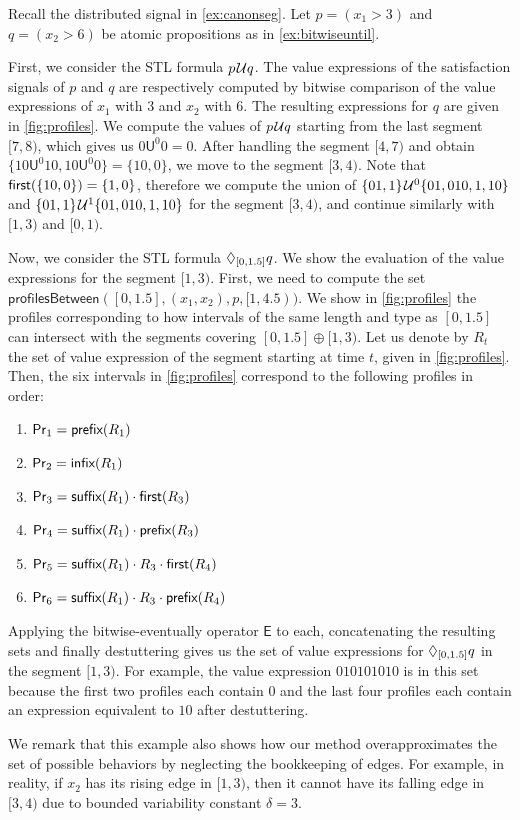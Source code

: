 \begin{example}
	Recall the distributed signal in \cref{ex:canonseg}.
	Let $p = (x_1 > 3)$ and $q = (x_2 > 6)$ be atomic propositions as in \cref{ex:bitwiseuntil}.
		
	First, we consider the STL formula $p \kern.1em\mathcal{U} q$.
	The value expressions of the satisfaction signals of $p$ and $q$ are respectively computed by bitwise comparison of the value expressions of $x_1$ with 3 and $x_2$ with 6.
	The resulting expressions for $q$ are given in \cref{fig:profiles}.
	We compute the values of $p \kern.1em\mathcal{U} q$ starting from the last segment $[7,8)$, which gives us $0 \mathsf{U}^0 0 = 0$.
	After handling the segment $[4,7)$ and obtain $\{ 10 \mathsf{U}^0 10, 10 \mathsf{U}^0 0 \} = \{10, 0\}$, we move to the segment $[3,4)$.
	Note that $\textsf{first}(\{10, 0\}) = \{1,0\}$, therefore we compute the union of $\{01, 1\} \kern.1em\mathcal{U}^0 \{01, 010, 1, 10\}$ and $\{01, 1\} \kern.1em\mathcal{U}^1 \{01, 010, 1, 10\}$ for the segment $[3,4)$, and continue similarly with $[1,3)$ and $[0,1)$.
	
	Now, we consider the STL formula $\lozenge_{[0,1.5]} q$.
	We show the evaluation of the value expressions for the segment $[1,3)$.
	First, we need to compute the set $\mathsf{profilesBetween}([0,1.5], (x_1, x_2), p, [1,4.5))$.
	We show in \cref{fig:profiles} the profiles corresponding to how intervals of the same length and type as $[0,1.5]$ can intersect with the segments covering $[0,1.5] \oplus [1,3)$.
	Let us denote by $R_t$ the set of value expression of the segment starting at time $t$, given in \cref{fig:profiles}.
	Then, the six intervals in \cref{fig:profiles} correspond to the following profiles in order:
	\begin{enumerate}
		\item $\mathsf{Pr}_1 = \textsf{prefix}(R_1)$
		\item $\mathsf{Pr}_2 = \textsf{infix}(R_1)$
		\item $\mathsf{Pr}_3 = \textsf{suffix}(R_1) \cdot \textsf{first}(R_3)$
		\item $\mathsf{Pr}_4 = \textsf{suffix}(R_1) \cdot \textsf{prefix}(R_3)$
		\item $\mathsf{Pr}_5 = \textsf{suffix}(R_1) \cdot R_3 \cdot \textsf{first}(R_4)$
		\item $\mathsf{Pr}_6 = \textsf{suffix}(R_1) \cdot R_3 \cdot \textsf{prefix}(R_4)$
	\end{enumerate}
	Applying the bitwise-eventually operator $\mathsf{E}$ to each, concatenating the resulting sets and finally destuttering gives us the set of value expressions for $\lozenge_{[0,1.5]} q$ in the segment $[1,3)$.
	For example, the value expression $0 10 10 10 10$ is in this set because the first two profiles each contain $0$ and the last four profiles each contain an expression equivalent to $10$ after destuttering.
	
	We remark that this example also shows how our method overapproximates the set of possible behaviors by neglecting the bookkeeping of edges.
	For example, in reality, if $x_2$ has its rising edge in $[1,3)$, then it cannot have its falling edge in $[3,4)$ due to bounded variability constant $\delta = 3$.
\end{example}


